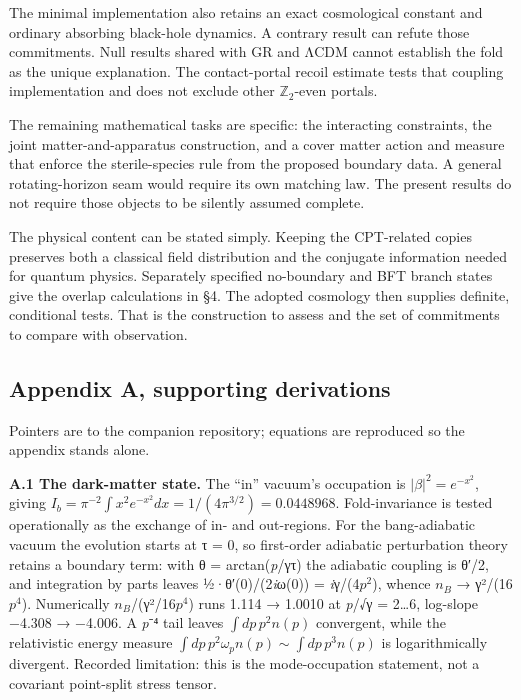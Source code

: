 \documentclass[
]{article}
\begin{document}
The minimal implementation also retains an exact cosmological constant
and ordinary absorbing black-hole dynamics. A contrary result can refute
those commitments. Null results shared with GR and ΛCDM cannot establish
the fold as the unique explanation. The contact-portal recoil estimate
tests that coupling implementation and does not exclude other
\(\mathbb Z_2\)-even portals.

The remaining mathematical tasks are specific: the interacting
constraints, the joint matter-and-apparatus construction, and a cover
matter action and measure that enforce the sterile-species rule from the
proposed boundary data. A general rotating-horizon seam would require
its own matching law. The present results do not require those objects
to be silently assumed complete.

The physical content can be stated simply. Keeping the CPT-related
copies preserves both a classical field distribution and the conjugate
information needed for quantum physics. Separately specified no-boundary
and BFT branch states give the overlap calculations in §4. The adopted
cosmology then supplies definite, conditional tests. That is the
construction to assess and the set of commitments to compare with
observation.

\subsection{Appendix A, supporting
derivations}\label{appendix-a-supporting-derivations}

Pointers are to the companion repository; equations are reproduced so
the appendix stands alone.

\textbf{A.1 The dark-matter state.} The ``in'' vacuum's occupation is
\(|\beta|^2=e^{-x^2}\), giving
\(I_b=\pi^{-2}\int x^2e^{-x^2}dx=1/(4\pi^{3/2})=0.0448968\).
Fold-invariance is tested operationally as the exchange of in- and
out-regions. For the bang-adiabatic vacuum the evolution starts at τ =
0, so first-order adiabatic perturbation theory retains a boundary term:
with θ = arctan(\emph{p}/γτ) the adiabatic coupling is θ′/2, and
integration by parts leaves ½·θ′(0)/(2\emph{i}ω(0)) =
\emph{i}γ/(4\(p^2\)), whence \(n_{B}\) → γ²/(16\(p^4\)). Numerically
\(n_{B}\)/(γ²/16\(p^4\)) runs 1.114 → 1.0010 at \emph{p}/√γ = 2\ldots6,
log-slope −4.308 → −4.006. A \emph{p}⁻⁴ tail leaves \(\int dp\,p^2n(p)\)
convergent, while the relativistic energy measure
\(\int dp\,p^2\omega_p n(p)\sim\int dp\,p^3n(p)\) is logarithmically
divergent. Recorded limitation: this is the mode-occupation statement,
not a covariant point-split stress tensor.
\end{document}
